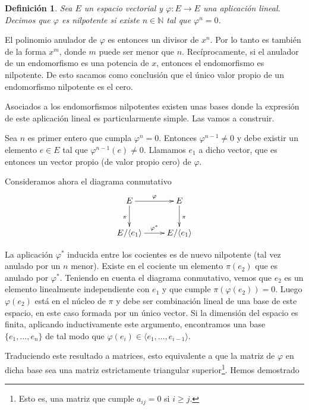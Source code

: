 \documentclass[a4paper,draft,12pt]{scrartcl}
\newtheorem{defi}{Definición}[section]%
\newcommand{\N}{\mathbb{N}}%
\newcommand{\df}[1]{\textsf{\color{blue}#1}}
\begin{document}
\begin{defi}

Sea $E$ un espacio vectorial y $\varphi : E \rightarrow E$ una aplicación lineal.  Decimos que $\varphi$ es  \df{nilpotente}   si existe $n \in \N$ tal que $\varphi^n=0$.

\end{defi}

El polinomio anulador de $\varphi$ es entonces un divisor de $x^n$.  Por lo tanto es también de la forma $x^m$, donde $m$ puede ser menor que $n$. Recíprocamente, si el anulador de un endomorfismo es una potencia de $x$, entonces el endomorfismo es nilpotente.  De esto sacamos como conclusión que el único  valor propio de un endomorfismo nilpotente es el cero.

Asociados a los endomorfismos nilpotentes existen unas bases donde la expresión de este aplicación lineal es particularmente simple.  Las vamos a construir.

Sea $n$ es primer entero que cumpla $\varphi^n=0$.  Entonces $\varphi^{n-1}\neq 0$ y debe existir un elemento $e\in E$ tal que $\varphi^{n-1}(e)\neq 0$.  Llamamos $e_1$ a dicho vector, que es entonces un vector propio (de valor propio cero) de $\varphi$.



Consideramos ahora el diagrama conmutativo
$$
\xymatrix{
E \ar[r]^\varphi\ar[d]_\pi& E \ar[d]^\pi\\
E/\langle e_1\rangle \ar[r]^{\varphi^*}& E /\langle e_1 \rangle
}
$$


La aplicación $\varphi^*$ inducida entre los cocientes es de nuevo nilpotente (tal vez anulado por un $n$  menor).  Existe en el cociente un elemento $\pi(e_2)$ que es anulado por $\varphi^*$.  Teniendo en cuenta el diagrama conmutativo, vemos que $e_2$ es un elemento linealmente independiente con $e_1$ y que cumple $\pi(\varphi(e_2))=0$.  Luego $\varphi(e_2)$ está en el núcleo de $\pi$ y debe ser combinación lineal de una base de este espacio, en este caso formada por un único vector. Si la dimensión del espacio es finita, aplicando inductivamente este argumento, encontramos una base $\{e_1, \dots, e_n\}$ de tal modo que $\varphi(e_i) \in \langle e_1, \dots, e_{i-1}\rangle$. 

Traduciendo este resultado a matrices, esto equivalente a que la matriz de $\varphi$ en dicha base sea una matriz estrictamente triangular superior\footnote{Esto es, una matriz que cumple $a_{ij}=0 $ si $ i \geq j$.}.  Hemos demostrado 
\end{document}
